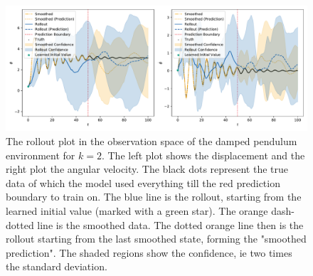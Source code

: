 			\begin{figure}
				\centering
				\includegraphics[width=\linewidth]{figures/results/pendulum-damped/run-latent-dim-02/rollout-observations-N0.pdf}
				\caption{The rollout plot in the observation space of the damped pendulum environment for \(k = 2\). The left plot shows the displacement and the right plot the angular velocity. The black dots represent the true data of which the model used everything till the red prediction boundary to train on. The blue line is the rollout, starting from the learned initial value (marked with a green star). The orange dash-dotted line is the smoothed data. The dotted orange line then is the rollout starting from the last smoothed state, forming the "smoothed prediction". The shaded regions show the confidence, \ac{ie} two times the standard deviation.}
				\label{fig:pendulumDampedRolloutL02}
			\end{figure}

%

